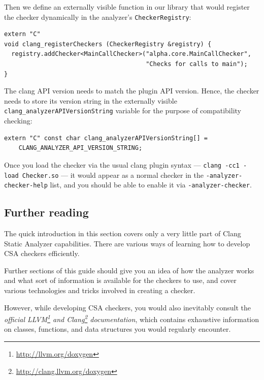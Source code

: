 \documentclass[a4paper,12pt]{article}
\newenvironment{nobr}{\begin{minipage}{\textwidth}\setlength\parskip{1em}
}{\end{minipage}\ignorespacesafterend}
\begin{document}
\begin{nobr}
Then we define an externally visible function in our library that would register the checker dynamically in the analyzer's \lstinline|CheckerRegistry|:

\begin{lstlisting}[style=cplusplus,numbers=none]
extern "C"
void clang_registerCheckers (CheckerRegistry &registry) {
  registry.addChecker<MainCallChecker>("alpha.core.MainCallChecker",
                                       "Checks for calls to main");
}
\end{lstlisting}
\end{nobr}

\begin{nobr}
The clang API version needs to match the plugin API version. Hence, the checker needs to store its version string in the externally visible \lstinline|clang_analyzerAPIVersionString| variable for the purpose of compatibility checking:

\begin{lstlisting}[style=cplusplus,numbers=none]
extern "C" const char clang_analyzerAPIVersionString[] =
    CLANG_ANALYZER_API_VERSION_STRING;
\end{lstlisting}
\end{nobr}

Once you load the checker via the usual clang plugin syntax --- \lstinline|clang -cc1 -load Checker.so| --- it would appear as a normal checker in the \lstinline|-analyzer-checker-help| list, and you should be able to enable it via \lstinline|-analyzer-checker|.


\subsection{Further reading}

The quick introduction in this section covers only a very little part of Clang Static Analyzer capabilities. There are various ways of learning how to develop CSA checkers efficiently.

Further sections of this guide should give you an idea of how the analyzer works and what sort of information is available for the checkers to use, and cover various technologies and tricks involved in creating a checker.

However, while developing CSA checkers, you would also inevitably consult the \emph{official LLVM\footnote{\url{http://llvm.org/doxygen}} and Clang\footnote{\url{http://clang.llvm.org/doxygen}} documentation}, which contains exhaustive information on classes, functions, and data structures you would regularly encounter.
\end{document}
